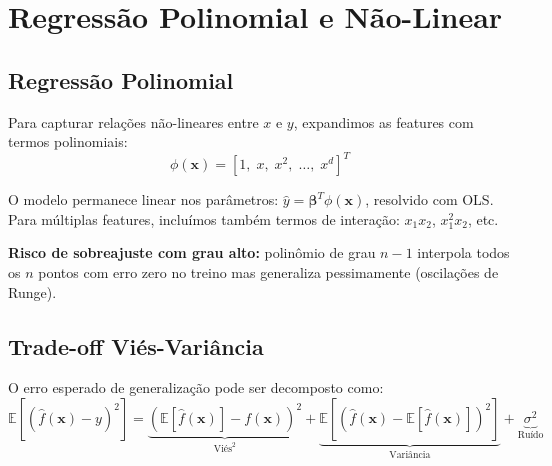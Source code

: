 \documentclass[12pt,a4paper]{article}
\begin{document}
\section{Regressão Polinomial e Não-Linear}

\subsection{Regressão Polinomial}

Para capturar relações não-lineares entre $x$ e $y$, expandimos as features com termos polinomiais:
\[
  \phi(\mathbf{x}) = [1,\; x,\; x^2,\; \ldots,\; x^d]^T
\]

O modelo permanece linear nos parâmetros: $\hat{y} = \boldsymbol{\beta}^T\phi(\mathbf{x})$, resolvido com OLS. Para múltiplas features, incluímos também termos de interação: $x_1 x_2$, $x_1^2 x_2$, etc.

\textbf{Risco de sobreajuste com grau alto:} polinômio de grau $n-1$ interpola todos os $n$ pontos com erro zero no treino mas generaliza pessimamente (oscilações de Runge).

\subsection{Trade-off Viés-Variância}

O erro esperado de generalização pode ser decomposto como:
\[
  \mathbb{E}[(\hat{f}(\mathbf{x}) - y)^2] = \underbrace{(\mathbb{E}[\hat{f}(\mathbf{x})] - f(\mathbf{x}))^2}_{\text{Viés}^2} + \underbrace{\mathbb{E}[(\hat{f}(\mathbf{x}) - \mathbb{E}[\hat{f}(\mathbf{x})])^2]}_{\text{Variância}} + \underbrace{\sigma^2}_{\text{Ruído}}
\]
\end{document}
